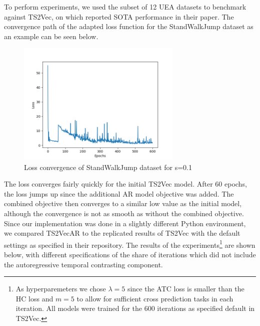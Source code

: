 \documentclass{article}
\begin{document}
To perform experiments, we used the subset of 12 UEA datasets to benchmark against TS2Vec, on which \citet{ts2vec} reported SOTA performance in their paper. The convergence path of the adapted loss function for the StandWalkJump dataset as an example can be seen below. \\

\begin{figure}[H]
  \centering
  \includegraphics[width=0.7\textwidth]{fig/StandWalkJump_default_ar_2.png}
  \caption{Loss convergence of StandWalkJump dataset for s=0.1}
\end{figure}

The loss converges fairly quickly for the initial TS2Vec model. After 60 epochs, the loss jumps up since the additional AR model objective was added. The combined objective then converges to a similar low value as the initial model, although the convergence is not as smooth as without the combined objective. \\

Since our implementation was done in a slightly different Python environment, we compared TS2VecAR to the replicated results of TS2Vec with the default settings as specified in their repository. The results of the experiments\footnote{As hyperparemeters we chose $\lambda = 5$ since the ATC loss is smaller than the HC loss and $m=5$ to allow for sufficient cross prediction tasks in each iteration. All models were trained for the 600 iterations as specified default in TS2Vec.} are shown below, with different specifications of the share of iterations which did not include the autoregressive temporal contrasting component. \\
\end{document}
